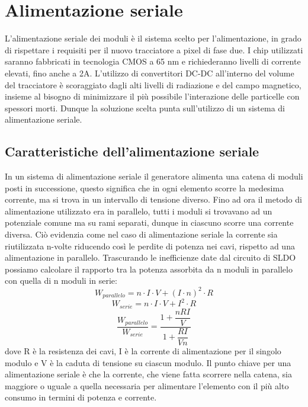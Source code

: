 \chapter{Alimentazione seriale}
L'alimentazione seriale dei moduli è il sistema scelto per l'alimentazione, in grado di rispettare i requisiti per il nuovo tracciatore a pixel di fase due. 
I chip utilizzati saranno fabbricati in tecnologia CMOS a 65 nm e richiederanno livelli di corrente elevati, fino anche a 2A. 
L'utilizzo di convertitori DC-DC all'interno del volume del tracciatore è scoraggiato  dagli alti livelli di radiazione e del campo magnetico, insieme al bisogno di minimizzare il più possibile  l'interazione delle particelle con spessori morti. 
Dunque la soluzione scelta punta sull'utilizzo di un sistema di alimentazione seriale. 

\section{Caratteristiche dell'alimentazione seriale}
In un sistema di alimentazione seriale il generatore alimenta una catena di moduli posti in successione, questo significa che in ogni elemento scorre la medesima corrente, ma si trova in un intervallo di tensione diverso. Fino ad ora il metodo di alimentazione utilizzato era in parallelo, tutti i moduli si trovavano ad un potenziale comune ma su rami separati, dunque in ciascuno scorre una corrente diversa.
Ciò evidenzia come nel caso di alimentazione seriale la corrente sia riutilizzata n-volte riducendo così le perdite di potenza nei cavi, rispetto ad una alimentazione in parallelo. 
Trascurando le inefficienze date dal circuito di SLDO possiamo calcolare il rapporto tra la potenza assorbita da n moduli in parallelo con quella di n moduli in serie:
\begin{equation}
W_{parallelo} = n \cdot I \cdot V + (I\cdot n)^2 \cdot R
\end{equation}
\begin{equation}
W_{serie} = n \cdot I \cdot V + I^2 \cdot R
\end{equation}
\begin{equation}
\frac{W_{parallelo}}{W_{serie}} = \frac{1+ \dfrac{nRI}{V}}{1+\dfrac{RI}{Vn}}
\end{equation}
dove R è la resistenza dei cavi, I è la corrente di alimentazione per il singolo modulo e V è la caduta di tensione su ciascun modulo. 
Il punto chiave per una alimentazione seriale è che la corrente, che viene fatta scorrere nella catena, sia maggiore o uguale a quella necessaria per alimentare l'elemento con il più alto consumo in termini di potenza e corrente.
